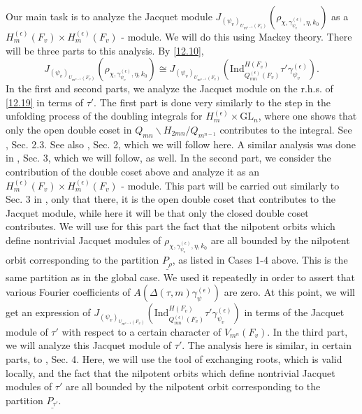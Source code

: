 \documentclass[12pts]{amsart}
\newcommand{\GL}{{\mathrm{GL}}}
\newcommand{\Ind}{{\mathrm{Ind}}}
\begin{document}
Our main task is to analyze the Jacquet module $J_{(\psi_v)_{U_{m^{n-1}}(F_v)}}(\rho_{\chi,\gamma_{\psi_v}^{(\epsilon)},\eta,k_0})$ as a $H_m^{(\epsilon)}(F_v)\times H_m^{(\epsilon)}(F_v)$ - module. We will do this using Mackey theory. There will be three parts to this analysis. By \eqref{12.10},
\begin{equation}\label{12.19}
J_{(\psi_v)_{U_{m^{n-1}}(F_v)}}(\rho_{\chi,\gamma_{\psi_v}^{(\epsilon)},\eta,k_0})\cong J_{(\psi_v)_{U_{m^{n-1}}(F_v)}}(\Ind^{H(F_v)}_{Q^{(\epsilon)}_{mn}(F_v)}\tau'\gamma_{\psi_v}^{(\epsilon)}).
\end{equation}
In the first and second parts, we analyze the Jacquet module on the r.h.s. of \eqref{12.19} in terms of $\tau'$. The first part is done very similarly to the step in the unfolding process of the doubling integrals for $H_m^{(\epsilon)}\times \GL_n$, where one shows that only the open double coset in $Q_{mn}\backslash H_{2mn}/Q_{m^{n-1}}$ contributes to the integral. See \cite{CFGK16}, Sec. 2.3. See also \cite{GS18}, Sec. 2, which we will follow here. A similar analysis was done in \cite{GJS15}, Sec. 3, which we will follow, as well. In the second part, we consider the contribution of the double coset above and analyze it as an $H_m^{(\epsilon)}(F_v)\times H_m^{(\epsilon)}(F_v)$ - module. This part will be carried out similarly to Sec. 3 in \cite{GS18}, only that there, it is the open double coset that contributes to the Jacquet module, while here it will be that only the closed double coset contributes. We will use for this part the fact that the nilpotent orbits which define nontrivial Jacquet modules of  $\rho_{\chi,\gamma_{\psi_v}^{(\epsilon)},\eta,k_0}$ are all bounded by the nilpotent orbit corresponding to the partition $\underline{P_\rho}$, as listed in Cases 1-4 above. This is the same partition as in the global case. We used it repeatedly in order to assert that various Fourier coefficients of $A(\Delta(\tau,m)\gamma_\psi^{(\epsilon)})$ are zero. At this point, we will get an expression of $J_{(\psi_v)_{U_{m^{n-1}}(F_v)}}(\Ind^{H(F_v)}_{Q^{(\epsilon)}_{mn}(F_v)}\tau'\gamma_{\psi_v}^{(\epsilon)})$ in terms of the Jacquet module of $\tau'$ with respect to a certain character of $V_{m^n}(F_v)$. In the third part, we will analyze this Jacquet module of $\tau'$. The analysis here is similar, in certain parts, to \cite{GJS15}, Sec. 4. Here, we will use the tool of exchanging roots, which is valid locally, and the fact that the nilpotent orbits which define 
nontrivial Jacquet modules of $\tau'$ are all bounded by the nilpotent orbit corresponding to the partition $\underline{P_{\tau'}}$.
\end{document}
